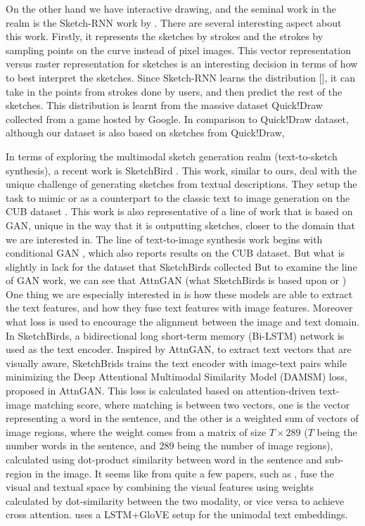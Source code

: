 On the other hand we have interactive drawing, and the seminal work in the realm is the Sketch-RNN work by \citep{ha2017neural}. There are several interesting aspect about this work. Firstly, it represents the sketches by strokes and the strokes by sampling points on the curve instead of pixel images. This vector representation versus raster representation for sketches is an interesting decision in terms of how to best interpret the sketches. Since Sketch-RNN learns the distribution [], it can take in the points from strokes done by users, and then predict the rest of the sketches. This distribution is learnt from the massive dataset Quick!Draw collected from a game hosted by Google. In comparison to Quick!Draw dataset, although our dataset is also based on sketches from Quick!Draw,     



In terms of exploring the multimodal sketch generation realm (text-to-sketch synthesis), a recent work is SketchBird \citep{sketchbirds}. This work, similar to ours, deal with the unique challenge of generating sketches from textual descriptions. They setup the task to mimic or as a counterpart to the classic text to image generation on the CUB dataset \citep{WahCUB_200_2011}. 
This work is also representative of a line of work that is based on GAN, unique in the way that it is outputting sketches, closer to the domain that we are interested in.
The line of text-to-image synthesis work begins with conditional GAN \citep{cGAN_text_image}, which also reports results on the CUB dataset. But what is slightly in lack for the dataset that SketchBirds collected  
But to examine the line of GAN work, we can see that AttnGAN \citep{attngan_paper} (what SketchBirds is based upon or ) 
One thing we are especially interested in is how these models are able to extract the text features, and how they fuse text features with image features. Moreover what loss is used to encourage the alignment between the image and text domain. 
In SketchBirds, a bidirectional long short-term memory (Bi-LSTM) network is used as the text encoder. Inspired by AttnGAN, to extract text vectors that are visually aware, SketchBrids trains the text encoder with image-text pairs while minimizing the Deep Attentional Multimodal Similarity Model (DAMSM) loss, proposed in AttnGAN. This loss is calculated based on attention-driven text-image matching score, where matching is between two vectors, one is the vector representing a word in the sentence, and the other is a weighted sum of vectors of image regions, where the weight comes from a matrix of size $T\times 289$ ($T$ being the number words in the sentence, and $289$ being the number of image regions), calculated using dot-product similarity between word in the sentence and sub-region in the image. 
It seems like from quite a few papers, such as \cite{joyce-chai-zscl}, fuse the visual and textual space by combining the visual features using weights calculated by dot-similarity between the two modality, or vice versa to achieve cross attention. \cite{joyce-chai-zscl} uses a LSTM+GloVE setup for the unimodal text embeddings.       

